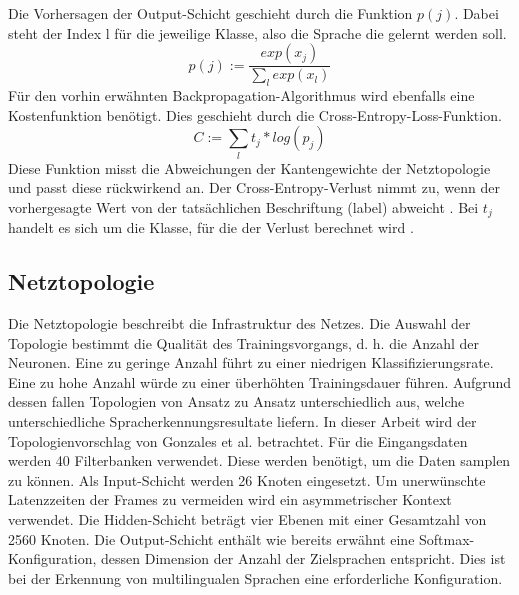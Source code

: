  Die Vorhersagen der Output-Schicht geschieht durch die Funktion $p(j)$. Dabei steht der Index l für die jeweilige Klasse, also die Sprache die gelernt werden soll.
\begin{equation*}
p(j) := \frac{ exp(x_{j}) }{\sum_{l}{}{ exp(x_{l})} }
\label{eq:soft}
\end{equation*}
Für den vorhin erwähnten Backpropagation-Algorithmus wird ebenfalls eine Kostenfunktion benötigt. Dies geschieht durch die Cross-Entropy-Loss-Funktion.
\begin{equation*}
C:= \sum_{l}{}{ t_{j} * log(p_{j})} 
\label{eq:back}
\end{equation*}
Diese Funktion misst die Abweichungen der Kantengewichte der Netztopologie und passt diese rückwirkend an. Der Cross-Entropy-Verlust nimmt zu, wenn der vorhergesagte Wert von der tatsächlichen Beschriftung (label) abweicht \cite{MLCheatsheet.2017}. Bei $t_{j}$ handelt es sich um die Klasse, für die der Verlust berechnet wird \cite{GonzalezDominguez.2015}.

\subsection{Netztopologie}
Die Netztopologie beschreibt die Infrastruktur des Netzes. Die Auswahl der Topologie bestimmt die Qualität des Trainingsvorgangs, d. h. die Anzahl der Neuronen. Eine zu geringe Anzahl führt zu einer niedrigen Klassifizierungsrate. Eine zu hohe Anzahl würde zu einer überhöhten Trainingsdauer führen. Aufgrund dessen fallen Topologien von Ansatz zu Ansatz unterschiedlich aus, welche unterschiedliche Spracherkennungsresultate liefern. In dieser Arbeit wird der Topologienvorschlag von Gonzales et al. betrachtet. Für die Eingangsdaten werden 40 Filterbanken verwendet. Diese werden benötigt, um die Daten samplen zu können. Als Input-Schicht werden 26 Knoten eingesetzt. Um unerwünschte Latenzzeiten der Frames zu vermeiden wird ein asymmetrischer Kontext verwendet. Die Hidden-Schicht beträgt vier Ebenen mit einer Gesamtzahl von 2560 Knoten. Die Output-Schicht enthält wie bereits erwähnt eine Softmax-Konfiguration, dessen Dimension der Anzahl der Zielsprachen entspricht. Dies ist bei der Erkennung von multilingualen Sprachen eine erforderliche Konfiguration.
 
